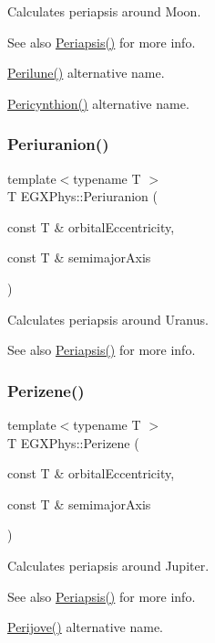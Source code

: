 Calculates periapsis around Moon. 

\begin{DoxySeeAlso}{See also}
\mbox{\hyperlink{group___e_g_x_phys-_periapsis_ga4414ac75539371ec874a3d25cad6c9fe}{Periapsis()}} for more info. 

\mbox{\hyperlink{group___e_g_x_phys-_periapsis_ga2cc7ab05e18d32c94d8d74972e032793}{Perilune()}} alternative name. 

\mbox{\hyperlink{group___e_g_x_phys-_periapsis_gaeeba153b188cd06cbd233eaef12f0a6a}{Pericynthion()}} alternative name. 
\end{DoxySeeAlso}
\mbox{\label{group___e_g_x_phys-_periapsis_gab8b8131a617dd2d2a4de1d48accd7442}} 
\subsubsection{\texorpdfstring{Periuranion()}{Periuranion()}}
{\footnotesize\ttfamily template$<$typename T $>$ \\
T E\+G\+X\+Phys\+::\+Periuranion (\begin{DoxyParamCaption}\item[{const T \&}]{orbital\+Eccentricity,  }\item[{const T \&}]{semimajor\+Axis }\end{DoxyParamCaption})}



Calculates periapsis around Uranus. 

\begin{DoxySeeAlso}{See also}
\mbox{\hyperlink{group___e_g_x_phys-_periapsis_ga4414ac75539371ec874a3d25cad6c9fe}{Periapsis()}} for more info. 
\end{DoxySeeAlso}
\mbox{\label{group___e_g_x_phys-_periapsis_ga0523c65b7fc26e675388b2c3d38aa00b}} 
\subsubsection{\texorpdfstring{Perizene()}{Perizene()}}
{\footnotesize\ttfamily template$<$typename T $>$ \\
T E\+G\+X\+Phys\+::\+Perizene (\begin{DoxyParamCaption}\item[{const T \&}]{orbital\+Eccentricity,  }\item[{const T \&}]{semimajor\+Axis }\end{DoxyParamCaption})}



Calculates periapsis around Jupiter. 

\begin{DoxySeeAlso}{See also}
\mbox{\hyperlink{group___e_g_x_phys-_periapsis_ga4414ac75539371ec874a3d25cad6c9fe}{Periapsis()}} for more info. 

\mbox{\hyperlink{group___e_g_x_phys-_periapsis_ga075052f7ff9aa1d5fdf4501b493be86b}{Perijove()}} alternative name. 
\end{DoxySeeAlso}
